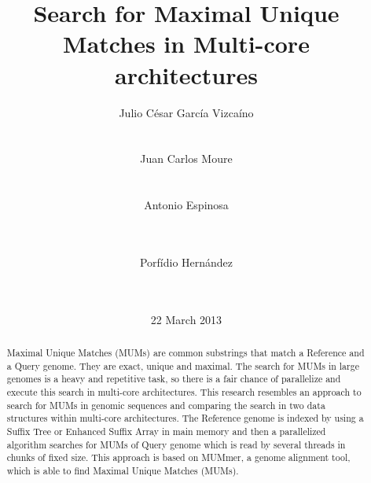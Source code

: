 \documentclass{acm_proc_article-sp}
\begin{document}
\title{Search for Maximal Unique Matches in Multi-core architectures}

%
\author{
\alignauthor Julio C\'esar Garc\'ia Vizca\'ino\\
       \\
       \\
\alignauthor Juan Carlos Moure\\
      \\
       \\
\alignauthor Antonio Espinosa\\
       \\
       \\
\and  %
\alignauthor Porf\'idio Hern\'andez\\
       \\
       \\
}

\date{22 March 2013}

\maketitle
\begin{abstract}
  Maximal Unique Matches (MUMs) are common substrings that match a Reference and a Query genome. They are exact, unique and maximal. The search for MUMs in large genomes is a heavy and repetitive task, so there is a fair chance of parallelize and execute this search in multi-core architectures. This research resembles an approach to search for MUMs in genomic sequences and comparing the search in two data structures within multi-core architectures. The Reference genome is indexed by using a Suffix Tree or Enhanced Suffix Array in main memory and then a parallelized algorithm searches for MUMs of Query genome which is read by several threads in chunks of fixed size. This approach is based on MUMmer, a genome alignment tool, which is able to find Maximal Unique Matches (MUMs). 
\end{abstract}
\end{document}
